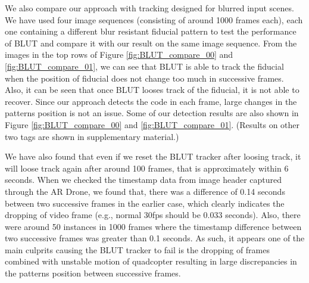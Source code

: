 \documentclass[10pt,twocolumn,letterpaper]{article}
\begin{document}
We also compare our approach with tracking designed for blurred input scenes.
We have used four image sequences (consisting of around 1000 frames each), each
one containing a different blur resistant fiducial pattern to test the performance of
BLUT \cite{Wu:2011} and compare it with our result on the same image sequence.
From the images in the top rows of Figure
\ref{fig:BLUT_compare_00} and \ref{fig:BLUT_compare_01}, we can see that BLUT is
able to track the fiducial when the position of fiducial does not change too
much in successive frames. Also, it can be seen that once BLUT looses 
track of the fiducial, it is not able to recover. Since our approach detects the
code in each frame, large changes in the patterns position is not an issue.
Some of our detection results are also shown in Figure
\ref{fig:BLUT_compare_00} and \ref{fig:BLUT_compare_01}. (Results on other two
tags are shown in supplementary material.)

We have also found that even if we reset the BLUT tracker after loosing track,
it will loose track again after around 100 frames, that is approximately within
6 seconds. When we checked the timestamp data from image header captured through
the AR Drone, we found that, there was a difference of 0.14 seconds between two
successive frames in the earlier case, which clearly indicates the dropping of
video frame (e.g., normal 30fps should be 0.033 seconds). Also, there were around 50
instances in 1000 frames where the timestamp difference between two successive
frames was greater than 0.1 seconds. As such, it appears one of the main
culprits causing the BLUT tracker to fail is the dropping of frames combined
with unstable motion of quadcopter resulting in large discrepancies in the
patterns position between successive frames.
\end{document}
